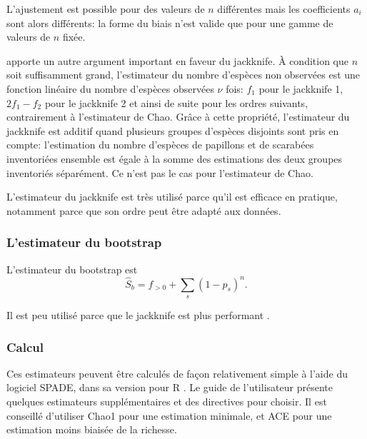 \documentclass[
  11pt,
  american,
  a4paper,
  extrafontsizes,onecolumn,openright
  ]{memoir}
\newlength{\rf}
\begin{document}
\normalsize

L'ajustement est possible pour des valeurs de \(n\) différentes mais les coefficients \(a_i\) sont alors différents: la forme du biais n'est valide que pour une gamme de valeurs de \(n\) fixée.

\textcite{Beguinot2016} apporte un autre argument important en faveur du jackknife.
À condition que \(n\) soit suffisamment grand, l'estimateur du nombre d'espèces non observées est une fonction linéaire du nombre d'espèces observées \(\nu\) fois: \(f_1\) pour le jackknife 1, \(2 f_1 - f_2\) pour le jackknife 2 et ainsi de suite pour les ordres suivants, contrairement à l'estimateur de Chao.
Grâce à cette propriété, l'estimateur du jackknife est additif quand plusieurs groupes d'espèces disjoints sont pris en compte: l'estimation du nombre d'espèces de papillons et de scarabées inventoriées ensemble est égale à la somme des estimations des deux groupes inventoriés séparément.
Ce n'est pas le cas pour l'estimateur de Chao.

L'estimateur du jackknife est très utilisé parce qu'il est efficace en pratique, notamment parce que son ordre peut être adapté aux données.

\hypertarget{lestimateur-du-bootstrap}{%
\subsubsection{L'estimateur du bootstrap}\label{lestimateur-du-bootstrap}}

L'estimateur du bootstrap \autocite{Smith1984} est
\begin{equation} 
  \label{eq:Smith1984}
  \hat{S}_\mathit{b} = {f_{>0}} + \sum_s{(1 - p_s)^n}.
\end{equation}

Il est peu utilisé parce que le jackknife est plus performant \autocite{Colwell1994}.

\hypertarget{calcul}{%
\subsubsection{Calcul}\label{calcul}}

Ces estimateurs peuvent être calculés de façon relativement simple à l'aide du logiciel SPADE, dans sa version pour R \autocite{Chao2016c}.
Le guide de l'utilisateur présente quelques estimateurs supplémentaires et des directives pour choisir.
Il est conseillé d'utiliser Chao1 pour une estimation minimale, et ACE pour une estimation moins biaisée de la richesse.
\end{document}
